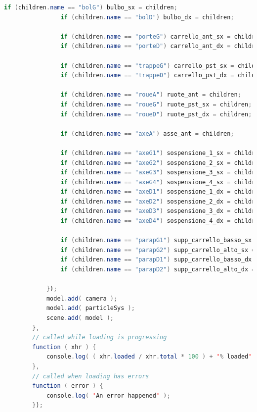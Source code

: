 \documentclass{article}
\begin{document}
\begin{lstlisting}[language=Java, caption=Bombardier-415 loader]
                if (children.name == "bolG") bulbo_sx = children;
                if (children.name == "bolD") bulbo_dx = children;

                if (children.name == "porteG") carrello_ant_sx = children;
                if (children.name == "porteD") carrello_ant_dx = children;

                if (children.name == "trappeG") carrello_pst_sx = children;
                if (children.name == "trappeD") carrello_pst_dx = children;

                if (children.name == "roueA") ruote_ant = children;
                if (children.name == "roueG") ruote_pst_sx = children;
                if (children.name == "roueD") ruote_pst_dx = children;

                if (children.name == "axeA") asse_ant = children;

                if (children.name == "axeG1") sospensione_1_sx = children;
                if (children.name == "axeG2") sospensione_2_sx = children;
                if (children.name == "axeG3") sospensione_3_sx = children;
                if (children.name == "axeG4") sospensione_4_sx = children;
                if (children.name == "axeD1") sospensione_1_dx = children;
                if (children.name == "axeD2") sospensione_2_dx = children;
                if (children.name == "axeD3") sospensione_3_dx = children;
                if (children.name == "axeD4") sospensione_4_dx = children;

                if (children.name == "parapG1") supp_carrello_basso_sx = children;
                if (children.name == "parapG2") supp_carrello_alto_sx = children;
                if (children.name == "parapD1") supp_carrello_basso_dx = children;
                if (children.name == "parapD2") supp_carrello_alto_dx = children;

            });
            model.add( camera );
            model.add( particleSys );
            scene.add( model );
        },
        // called while loading is progressing
        function ( xhr ) {
            console.log( ( xhr.loaded / xhr.total * 100 ) + '% loaded' );
        },
        // called when loading has errors
        function ( error ) {
            console.log( 'An error happened' );
        });
\end{lstlisting}
\end{document}
